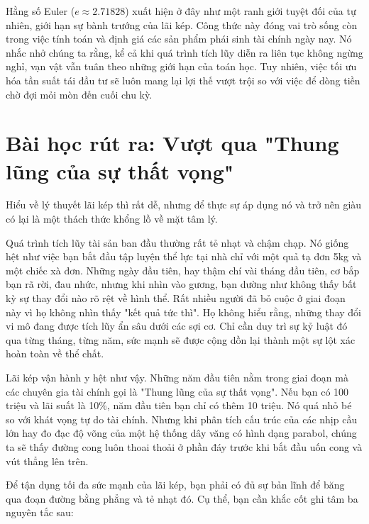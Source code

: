 \documentclass[14pt, a4paper, oneside]{extreport}
\begin{document}
Hằng số Euler ($e \approx 2.71828$) xuất hiện ở đây như một ranh giới tuyệt đối của tự nhiên, giới hạn sự bành trướng của lãi kép. Công thức này đóng vai trò sống còn trong việc tính toán và định giá các sản phẩm phái sinh tài chính ngày nay. Nó nhắc nhở chúng ta rằng, kể cả khi quá trình tích lũy diễn ra liên tục không ngừng nghỉ, vạn vật vẫn tuân theo những giới hạn của toán học. Tuy nhiên, việc tối ưu hóa tần suất tái đầu tư sẽ luôn mang lại lợi thế vượt trội so với việc để dòng tiền chờ đợi mỏi mòn đến cuối chu kỳ.

\section{Bài học rút ra: Vượt qua "Thung lũng của sự thất vọng"}

Hiểu về lý thuyết lãi kép thì rất dễ, nhưng để thực sự áp dụng nó và trở nên giàu có lại là một thách thức khổng lồ về mặt tâm lý. 

Quá trình tích lũy tài sản ban đầu thường rất tẻ nhạt và chậm chạp. Nó giống hệt như việc bạn bắt đầu tập luyện thể lực tại nhà chỉ với một quả tạ đơn 5kg và một chiếc xà đơn. Những ngày đầu tiên, hay thậm chí vài tháng đầu tiên, cơ bắp bạn rã rời, đau nhức, nhưng khi nhìn vào gương, bạn dường như không thấy bất kỳ sự thay đổi nào rõ rệt về hình thể. Rất nhiều người đã bỏ cuộc ở giai đoạn này vì họ không nhìn thấy "kết quả tức thì". Họ không hiểu rằng, những thay đổi vi mô đang được tích lũy ẩn sâu dưới các sợi cơ. Chỉ cần duy trì sự kỷ luật đó qua từng tháng, từng năm, sức mạnh sẽ được cộng dồn lại thành một sự lột xác hoàn toàn về thể chất. 

Lãi kép vận hành y hệt như vậy. Những năm đầu tiên nằm trong giai đoạn mà các chuyên gia tài chính gọi là "Thung lũng của sự thất vọng". Nếu bạn có 100 triệu và lãi suất là 10\%, năm đầu tiên bạn chỉ có thêm 10 triệu. Nó quá nhỏ bé so với khát vọng tự do tài chính. Nhưng khi phân tích cấu trúc của các nhịp cầu lớn hay đo đạc độ võng của một hệ thống dây văng có hình dạng parabol, chúng ta sẽ thấy đường cong luôn thoai thoải ở phần đáy trước khi bắt đầu uốn cong và vút thẳng lên trên. 

Để tận dụng tối đa sức mạnh của lãi kép, bạn phải có đủ sự bản lĩnh để băng qua đoạn đường bằng phẳng và tẻ nhạt đó. Cụ thể, bạn cần khắc cốt ghi tâm ba nguyên tắc sau:
\end{document}

